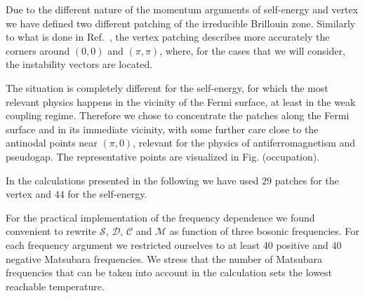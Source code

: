 Due to the different nature of the momentum arguments of self-energy and vertex we have defined two different patching of the irreducible Brillouin zone. 
Similarly to what is done in Ref.~, the vertex patching describes more accurately the corners around $(0,0)$ and $(\pi,\pi)$, where, for the cases that we will consider, the instability vectors are located.

The situation is completely different for the self-energy, for which the most relevant physics happens in the vicinity of the Fermi surface, at least in the weak coupling regime. Therefore we chose to concentrate the patches along the Fermi surface and in its immediate vicinity, with some further care close to the antinodal points near $(\pi,0)$, relevant for the physics of antiferromagnetism and pseudogap. The representative points are visualized in Fig. (occupation). 

In the calculations presented in the following we have used $29$ patches for the vertex and $44$ for the self-energy.

For the practical implementation of the frequency dependence we found convenient to rewrite $\mathcal{S}$, $\mathcal{D}$, $\mathcal{C}$ and $\mathcal{M}$ as function of three bosonic frequencies. 
For each frequency argument we restricted ourselves to at least $40$ positive and $40$ negative Matsubara frequencies. 
We stress that the number of Matsubara frequencies that can be taken into account in the calculation sets the lowest reachable temperature.

